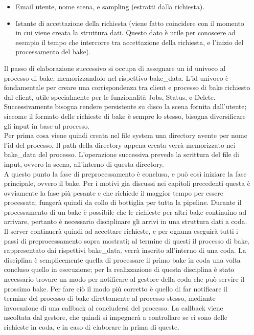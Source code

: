 \begin{itemize}
\item Email utente, nome scena, e sampling (estratti dalla richiesta).
\item Istante di accettazione della richiesta (viene fatto coincidere con il momento in cui viene creata la struttura dati. Questo dato è utile per conoscere ad esempio il tempo che intercorre tra accettazione della richiesta, e l’inizio del processamento del bake).
\end{itemize}
Il passo di elaborazione successivo si occupa di assegnare un id univoco al processo di bake, memorizzandolo nel rispettivo bake\_data. L’id univoco è fondamentale per creare una corrispondenza tra client e processo di bake richiesto dal client, utile specialmente per le funzionalità Jobs, Status, e Delete.
\\
Successivamente bisogna rendere persistente su disco la scena fornita dall’utente; siccome il formato delle richieste di bake è sempre lo stesso, bisogna diversificare gli input in base al processo.
\\
Per prima cosa viene quindi creata nel file system una directory avente per nome l’id del processo. Il path della directory appena creata verrà memorizzato nei bake\_data del processo.
L’operazione successiva prevede la scrittura del file di input, ovvero la scena, all’interno di questa directory.
\\ 
A questo punto la fase di preprocessamento è conclusa, e può così iniziare la fase principale, ovvero il bake. Per i motivi gia discussi nei capitoli precedenti questa è ovviamente la fase più pesante e che richiede il maggior tempo per essere processata; fungerà quindi da collo di bottiglia per tutta la pipeline. Durante il processamento di un bake è possibile che le richieste per altri bake continuino ad arrivare, pertanto è necessario disciplinare gli arrivi in una struttura dati a coda. 
\\
Il server continuerà quindi ad accettare richieste, e per ognuna eseguirà tutti i passi di preprocessamento sopra mostrati; al termine di questi il processo di bake, rappresentato dai rispettivi bake\_data, verrà inserito all’interno di una coda. La disciplina è semplicemente quella di processare il primo bake in coda una volta concluso quello in esecuzione; per la realizzazione di questa disciplina è stato necessario trovare un modo per notificare al gestore della coda che può servire il prossimo bake. Per fare ciò il modo più corretto è quello di far notificare il termine del processo di bake direttamente al processo stesso, mediante invocazione di una callback al concludersi del processo. La callback viene ascoltata dal gestore, che quindi si impegnerà a controllare se ci sono delle richieste in coda, e in caso di elaborare la prima di queste. 
